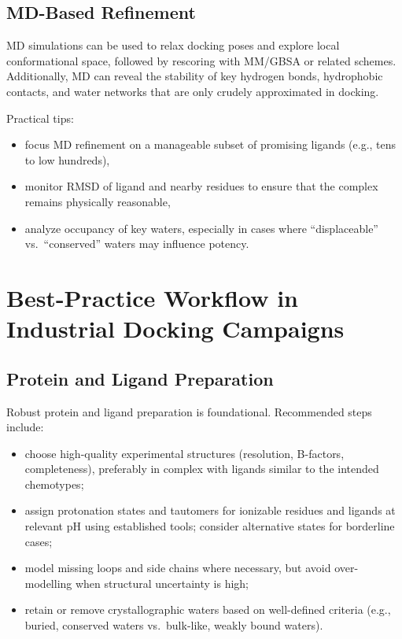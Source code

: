 \documentclass[12pt,a4paper]{article}
\begin{document}
\subsection{MD-Based Refinement}

MD simulations can be used to relax docking poses and explore local conformational space, followed by rescoring with MM/GBSA or related schemes. Additionally, MD can reveal the stability of key hydrogen bonds, hydrophobic contacts, and water networks that are only crudely approximated in docking.\cite{CH8_meng2011,CH8_MMGBSApose2011}

Practical tips:

\begin{itemize}
  \item focus MD refinement on a manageable subset of promising ligands (e.g., tens to low hundreds),
  \item monitor RMSD of ligand and nearby residues to ensure that the complex remains physically reasonable,
  \item analyze occupancy of key waters, especially in cases where ``displaceable'' vs.\ ``conserved'' waters may influence potency.
\end{itemize}

\section{Best-Practice Workflow in Industrial Docking Campaigns}

\subsection{Protein and Ligand Preparation}

Robust protein and ligand preparation is foundational. Recommended steps include:

\begin{itemize}
  \item choose high-quality experimental structures (resolution, B-factors, completeness), preferably in complex with ligands similar to the intended chemotypes;
  \item assign protonation states and tautomers for ionizable residues and ligands at relevant pH using established tools; consider alternative states for borderline cases;
  \item model missing loops and side chains where necessary, but avoid over-modelling when structural uncertainty is high;
  \item retain or remove crystallographic waters based on well-defined criteria (e.g., buried, conserved waters vs.\ bulk-like, weakly bound waters).
\end{itemize}
\end{document}
